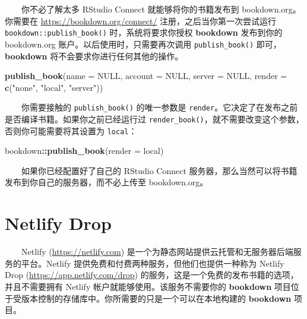 \documentclass[
  12pt,
]{krantz}
\newenvironment{Shaded}{\begin{snugshade}}{\end{snugshade}}
\newcommand{\AttributeTok}[1]{\textcolor[rgb]{0.13,0.29,0.53}{#1}}
\newcommand{\ConstantTok}[1]{\textcolor[rgb]{0.56,0.35,0.01}{#1}}
\newcommand{\FunctionTok}[1]{\textcolor[rgb]{0.13,0.29,0.53}{\textbf{#1}}}
\newcommand{\NormalTok}[1]{#1}
\newcommand{\SpecialCharTok}[1]{\textcolor[rgb]{0.81,0.36,0.00}{\textbf{#1}}}
\newcommand{\StringTok}[1]{\textcolor[rgb]{0.31,0.60,0.02}{#1}}
\theoremstyle{definition}
\theoremstyle{definition}
\theoremstyle{definition}
\theoremstyle{definition}
\theoremstyle{remark}
\begin{document}
  你不必了解太多 RStudio Connect 就能够将你的书籍发布到 bookdown.org。你需要在 \url{https://bookdown.org/connect/} 注册，之后当你第一次尝试运行 \texttt{bookdown::publish\_book()} 时，系统将要求你授权 \textbf{bookdown} 发布到你的 bookdown.org 账户。以后使用时，只需要再次调用 \texttt{publish\_book()} 即可，\textbf{bookdown} 将不会要求你进行任何其他的操作。

\begin{Shaded}
\begin{Highlighting}[]
\FunctionTok{publish\_book}\NormalTok{(}\AttributeTok{name =} \ConstantTok{NULL}\NormalTok{, }\AttributeTok{account =} \ConstantTok{NULL}\NormalTok{,}
  \AttributeTok{server =} \ConstantTok{NULL}\NormalTok{, }\AttributeTok{render =} \FunctionTok{c}\NormalTok{(}\StringTok{"none"}\NormalTok{, }\StringTok{"local"}\NormalTok{, }\StringTok{"server"}\NormalTok{))}
\end{Highlighting}
\end{Shaded}

  你需要接触的 \texttt{publish\_book()} 的唯一参数是 \texttt{render}。它决定了在发布之前是否编译书籍。如果你之前已经运行过 \texttt{render\_book()}，就不需要改变这个参数，否则你可能需要将其设置为 \texttt{\textquotesingle{}local\textquotesingle{}}：

\begin{Shaded}
\begin{Highlighting}[]
\NormalTok{bookdown}\SpecialCharTok{::}\FunctionTok{publish\_book}\NormalTok{(}\AttributeTok{render =} \StringTok{\textquotesingle{}local\textquotesingle{}}\NormalTok{)}
\end{Highlighting}
\end{Shaded}

  如果你已经配置好了自己的 RStudio Connect 服务器，那么当然可以将书籍发布到你自己的服务器，而不必上传至 bookdown.org。

\hypertarget{netlify-drop}{%
\section{Netlify Drop}\label{netlify-drop}}

  Netlify (\url{https://netlify.com}) 是一个为静态网站提供云托管和无服务器后端服务的平台。Netlify 提供免费和付费两种服务，但他们也提供一种称为 Netlify Drop (\url{https://app.netlify.com/drop}) 的服务，这是一个免费的发布书籍的选项，并且不需要拥有 Netlify 帐户就能够使用。该服务不需要你的 \textbf{bookdown} 项目位于受版本控制的存储库中。你所需要的只是一个可以在本地构建的 \textbf{bookdown} 项目。
\end{document}
